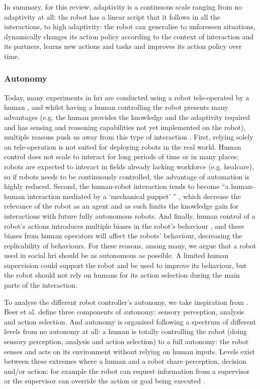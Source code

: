     In summary, for this review, adaptivity is a continuous scale ranging from no adaptivity at all: the robot has a linear script that it follows in all the interactions, to high adaptivity: the robot can generalise to unforeseen situations, dynamically changes its action policy according to the context of interaction and its partners, learns new actions and tasks and improves its action policy over time. 

\subsubsection{Autonomy}
	Today, many experiments in \gls{hri} are conducted using a robot tele-operated by a human \citep{riek2012wizard,baxter2016characterising}, and whilst having a human controlling the robot presents many advantages (e.g. the human provides the knowledge and the adaptivity required and has sensing and reasoning capabilities not yet implemented on the robot), multiple reasons push us away from this type of interaction \citep{Thill2013}. First, relying solely on tele-operation is not suited for deploying robots in the real world. Human control does not scale to interact for long periods of time or in many places: robots are expected to interact in fields already lacking workforce (e.g. healcare), so if robots needs to be continuously controlled, the advantage of automation is highly reduced. Second, the human-robot interaction tends to become ``a human-human interaction mediated by a `mechanical puppet' '' \citep{baxter2016characterising}, which decrease the relevance of the robot as an agent and as such limits the knowledge gain for interactions with future fully autonomous robots. And finally, human control of a robot's actions introduces multiple biases in the robot's behaviour \citep{howley2014effects}, and these biases from human operators will affect the robots' behaviour, decreasing the replicability of behaviours. For these reasons, among many, we argue that a robot used in social \gls{hri} should be as autonomous as possible. A limited human supervision could support the robot and be used to improve its behaviour, but the robot should not rely on humans for its action selection during the main parts of the interaction. 
		
    To analyse the different robot controller's autonomy, we take inspiration from \citet{beer2014toward}. Beer et al. define three components of autonomy: sensory perception, analysis and action selection. And autonomy is organised following a spectrum of different levels from no autonomy at all: a human is totally controlling the robot (doing sensory perception, analysis and action selection) to a full autonomy: the robot senses and acts on its environment without relying on human inputs. Levels exist between these extremes where a human and a robot share perception, decision and/or action: for example the robot can request information from a supervisor or the supervisor can override the action or goal being executed \citep{sheridan1978human}.
    
